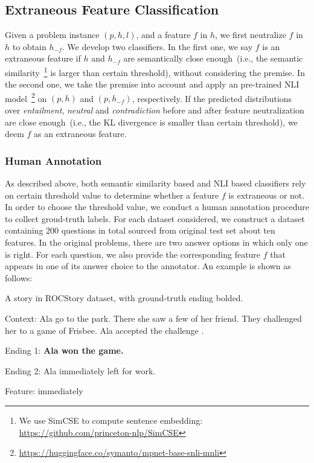 \subsection{Extraneous Feature Classification}
Given a problem instance $(p, h, l)$, and a feature $f$ in $h$, we first neutralize $f$ in $h$
to obtain $h_{-f}$. We develop two classifiers. In the first one, we say $f$ is an extraneous
feature if $h$ and $h_{-f}$ are semantically close enough~(i.e., the semantic similarity~\footnote{We use SimCSE to compute sentence embedding: \url{https://github.com/princeton-nlp/SimCSE}} is larger than certain threshold), without considering the premise.
In the second one, we take the premise into account and 
apply an pre-trained NLI model~\footnote{\url{https://huggingface.co/symanto/mpnet-base-snli-mnli}} on $(p, h)$ and $(p, h_{-f})$, respectively. If the predicted distributions over \textit{entailment}, \textit{neutral} and \textit{contradiction} before and after 
feature neutralization are close enough~(i.e., the KL divergence is smaller than certain threshold), we deem $f$ as an extraneous feature.

\subsubsection{Human Annotation}
As described above, both semantic similarity based and NLI based classifiers rely on certain threshold value to determine whether a feature $f$ is
extraneous or not. In order to choose the threshold value, we conduct a human annotation procedure to collect groud-truth labels. For each dataset considered, we construct a dataset containing 200 questions in total sourced from original test set about ten features. 
In the original problems, there are two answer options in which only one is right. For each question, we also provide the corresponding feature $f$ that appears in one of its answer choice to the annotator. An example is shown as follows:

\begin{example}
\label{exp:roc2}
A story in ROCStory dataset, with ground-truth ending bolded.
\begin{description}
\item{Context:} Ala go to the park. There she saw a few of her friend. They challenged her to a game of Frisbee. Ala accepted the challenge .
\item{Ending 1:} \textbf{Ala won the game.}
\item{Ending 2:} Ala immediately left for work.
\item{Feature:} immediately
\end{description}
\end{example}

